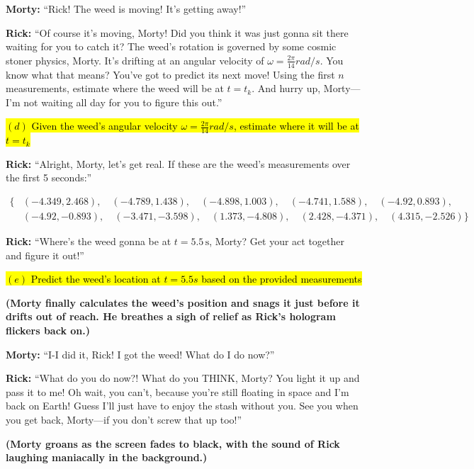 \documentclass[a4paper, 12pt]{exam}
\begin{document}
\noindent \textbf{Morty:} “Rick! The weed is moving! It’s getting away!” \bigskip

\noindent \textbf{Rick:} “Of course it’s moving, Morty! Did you think it was just gonna sit there waiting for you to catch it? The weed’s rotation is governed by some cosmic stoner physics, Morty. It’s drifting at an angular velocity of $\omega = \frac{2\pi}{14} rad/s$. You know what that means? You’ve got to predict its next move! Using the first \(n\) measurements, estimate where the weed will be at \(t = t_k\). And hurry up, Morty—I’m not waiting all day for you to figure this out.”

\bigskip

\hl{$(d)$ Given the weed's angular velocity $\omega = \frac{2\pi}{14} rad/s$, estimate where it will be at $t= t_k$}

\bigskip
\noindent \textbf{Rick:} “Alright, Morty, let’s get real. If these are the weed’s measurements over the first 5 seconds:”

\[
\begin{aligned}
\{
&(-4.349, 2.468), \quad (-4.789, 1.438), \quad (-4.898, 1.003), \quad (-4.741, 1.588), \quad (-4.92, 0.893), \\
&(-4.92, -0.893), \quad (-3.471, -3.598), \quad (1.373, -4.808), \quad (2.428, -4.371), \quad (4.315, -2.526)
\}
\end{aligned}
\]

\noindent \textbf{Rick:} “Where’s the weed gonna be at \(t = 5.5 \, \text{s}\), Morty? Get your act together and figure it out!”

\bigskip

\hl{$(e)$ Predict the weed's location at $t = 5.5 s$ based on the provided measurements} \bigskip

\noindent \textbf{(Morty finally calculates the weed’s position and snags it just before it drifts out of reach. He breathes a sigh of relief as Rick’s hologram flickers back on.)}
\bigskip

\noindent \textbf{Morty:} “I-I did it, Rick! I got the weed! What do I do now?” \bigskip

\noindent \textbf{Rick:} “What do you do now?! What do you THINK, Morty? You light it up and pass it to me! Oh wait, you can’t, because you’re still floating in space and I’m back on Earth! Guess I’ll just have to enjoy the stash without you. See you when you get back, Morty—if you don’t screw that up too!”

\bigskip

\noindent \textbf{(Morty groans as the screen fades to black, with the sound of Rick laughing maniacally in the background.)}
\end{document}
